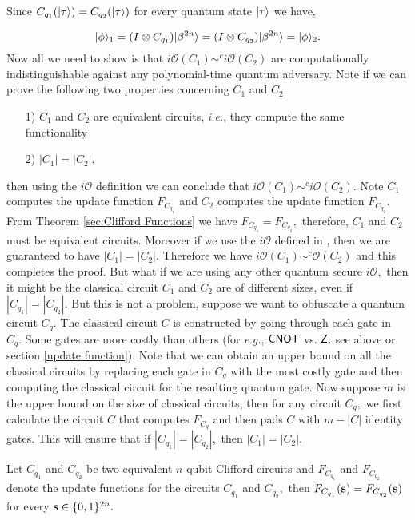 \begin{itemize}
Since $C_{q_1}({\lvert}\tau\rangle)=C_{q_2}({\lvert}\tau\rangle)$ for every quantum state ${\lvert}\tau\rangle$ we have,

\begin{equation}
\label{eq:1}
{\lvert}\phi\rangle_1=(I\otimes C_{q_1}) {\lvert}\beta^{2n}\rangle=(I\otimes C_{q_2}) {\lvert}\beta^{2n}\rangle={\lvert}\phi\rangle_2.
\end{equation}
Now all we need to show is that $i\mathcal{O}(C_1)\sim^ci\mathcal{O}(C_2)$ are computationally indistinguishable against any polynomial-time quantum adversary. Note if we can  prove the following two properties concerning $C_1$ and $C_2$

\begin{enumerate}
\item[1)] $C_1$ and $C_2$ are equivalent circuits, \emph{i.e.}, they compute the same functionality
\item[2)]  $|C_1|=|C_2|,$
\end{enumerate}
then using the $i\mathcal{O}$ definition we can conclude that $i\mathcal{O}(C_1)\sim^ci\mathcal{O}(C_2).$ Note $C_1$ computes the update function $F_{C_{q_1}}$ and $C_2$ computes the update function $F_{C_{q_2}}.$ From Theorem \ref{sec:Clifford Functions} we have $F_{C_{q_1}}=F_{C_{q_2}},$ therefore, $C_1$ and $C_2$ must be equivalent circuits. Moreover if we use the $i\mathcal{O}$ defined in , then we are guaranteed to have $|C_1|=|C_2|.$ Therefore we have $i\mathcal{O}(C_1)\sim^c\mathcal{O}(C_2)$ and this completes the proof. But what if we are using any other quantum secure $i\mathcal{O},$ then it might be the classical circuit $C_1$ and $C_2$ are of different sizes, even if  $|C_{q_1}|=|C_{q_2}|.$  But this is not a problem, suppose we want to obfuscate a quantum circuit $C_q$. The classical circuit $C$ is constructed by going through each gate in $C_{q}.$ Some gates are more costly than others (for \emph{e.g.}, ${\sf CNOT}$ vs. ${\sf Z},$ see above or section \ref{update function}). Note that we can obtain an upper bound on all the classical circuits by replacing each gate in $C_q$ with the most costly gate and then computing the classical circuit for the resulting quantum gate. Now suppose $m$ is the upper bound on the size of classical circuits, then for any circuit $C_q,$ we first calculate the circuit $C$ that computes $F_{C_q}$ and then pads $C$ with $m-|C|$ identity gates. This will ensure that if $|C_{q_1}|=|C_{q_2}|,$ then $|C_1|=|C_2|.$
\end{itemize}


\begin{theorem}\label{sec:Clifford Functions}
Let $C_{q_1}$ and $C_{q_2}$ be two equivalent $n$-qubit Clifford circuits and  $F_{C_{q_1}}$ and $F_{C_{q_2}}$  denote the update functions for the circuits $C_{q_1}$ and $C_{q_2},$ then $F_{C_{q_1}}({\bf s})=F_{C_{q_2}}({\bf s})$ for every ${\bf s}\in\{0,1\}^{2n}.$
\end{theorem}

